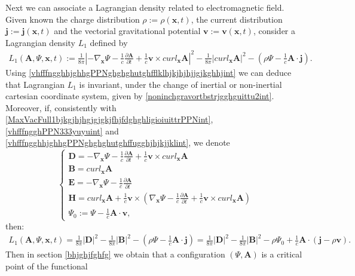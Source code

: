 \documentclass{article}
\theoremstyle{definition}
\theoremstyle{remark}
\renewcommand{\vec}[1]{\mathbf{#1}}
\newcommand{\er}{\eqref}
\newcommand{\er}{\eqref}
\begin{document}
Next we can associate a Lagrangian density related to
electromagnetic field. Given known the charge distribution
$\rho:=\rho(\vec x,t)$, the current distribution $\vec j:=\vec
j(\vec x,t)$ and the vectorial gravitational potential $\vec v:=\vec
v(\vec x,t)$, consider a Lagrangian density $L_1$ defined by
\begin{multline}\label{vhfffngghkjgghPPNint}
L_1\left(\vec A,\Psi,\vec
x,t\right):=\frac{1}{8\pi}\left|-\nabla_{\vec
x}\Psi-\frac{1}{c}\frac{\partial\vec A}{\partial t}+\frac{1}{c}\vec
v\times curl_{\vec x}\vec A\right|^2-\frac{1}{8\pi}\left|curl_{\vec
x}\vec A\right|^2-\left(\rho\Psi-\frac{1}{c}\vec A\cdot\vec
j\right).
\end{multline}
Using \er{vhfffngghhjghhgPPNghghghutghfflklhjkjhjhjjgjkghhjint} we
can deduce that Lagrangian $L_1$ is invariant, under the change of
inertial or non-inertial cartesian coordinate system, given by
\er{noninchgravortbstrjgghguittu2int}. Moreover, if, consistently
with \er{MaxVacFull1bjkgjhjhgjgjgkjfhjfdghghligioiuittrPPNint},
\er{vhfffngghPPN333yuyuint} and
\er{vhfffngghhjghhgPPNghghghutghffugghjhjkjjklint}, we denote
\begin{equation}\label{guigjgjffghPPNint}
\begin{cases}
\vec D=-\nabla_{\vec x}\Psi-\frac{1}{c}\frac{\partial\vec
A}{\partial t}+\frac{1}{c}\vec
v\times curl_{\vec x}\vec A\\
\vec B=curl_{\vec x}\vec A
\\
\vec E=-\nabla_{\vec x}\Psi-\frac{1}{c}\frac{\partial\vec A}{\partial t}
\\
\vec H=curl_{\vec x}\vec A+\frac{1}{c}\vec v\times\left(\nabla_{\vec
x}\Psi-\frac{1}{c}\frac{\partial\vec A}{\partial t}+\frac{1}{c}\vec
v\times curl_{\vec x}\vec A\right)
\\
\Psi_0:=\Psi-\frac{1}{c}\vec A\cdot\vec v,
\end{cases}
\end{equation}
then:
\begin{multline*}
L_1\left(\vec A,\Psi,\vec x,t\right)=\frac{1}{8\pi}\left|\vec
D\right|^2-\frac{1}{8\pi}\left|\vec
B\right|^2-\left(\rho\Psi-\frac{1}{c}\vec A\cdot\vec
j\right)=\frac{1}{8\pi}\left|\vec
D\right|^2-\frac{1}{8\pi}\left|\vec
B\right|^2-\rho\Psi_0+\frac{1}{c}\vec A\cdot(\vec j-\rho\vec v).
\end{multline*}
Then in section \ref{bhjghjfghfg} we obtain that a configuration
$(\Psi,\vec A)$ is a critical point of the functional
\end{document}

